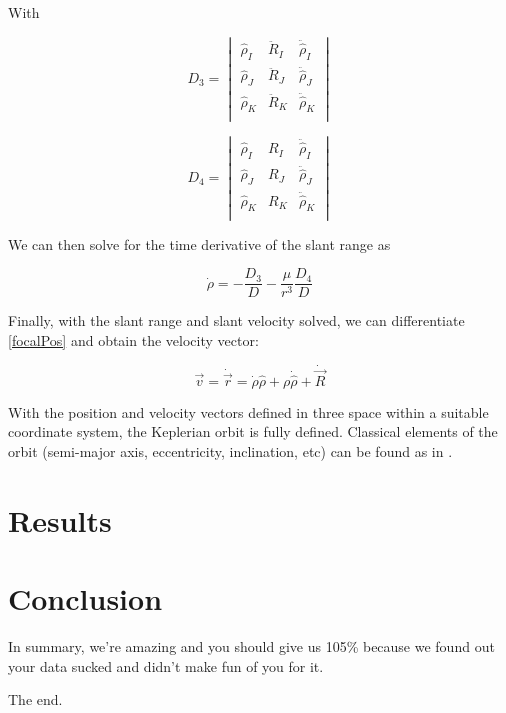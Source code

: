 \documentclass[11pt,twoside,letterpaper]{article}
\begin{document}
  With

  \begin{equation} \label{D3}
    D_3 = \begin{vmatrix}
    \hat{\rho}_I& \ddot{R}_I& \ddot{\hat{\rho}}_I \\
    \hat{\rho}_J& \ddot{R}_J& \ddot{\hat{\rho}}_J \\
    \hat{\rho}_K& \ddot{R}_K& \ddot{\hat{\rho}}_K \\
    \end{vmatrix}
  \end{equation}

  \begin{equation} \label{D4}
    D_4 = \begin{vmatrix}
    \hat{\rho}_I& R_I& \ddot{\hat{\rho}}_I \\
    \hat{\rho}_J& R_J& \ddot{\hat{\rho}}_J \\
    \hat{\rho}_K& R_K& \ddot{\hat{\rho}}_K \\
    \end{vmatrix}
  \end{equation}

  We can then solve for the time derivative of the slant range as

  \begin{equation} \label{slantDot}
    \dot{\rho} = -\frac{D_3}{D} - \frac{\mu}{r^3}\frac{D_4}{D}
  \end{equation}

  Finally, with the slant range and slant velocity solved, we can
  differentiate \ref{focalPos} and obtain the velocity vector:

  \begin{equation}\label{focalVel}
    \vec{v} = \dot{\vec{r}} =
    \dot{\rho}\hat{\rho} + \rho\dot{\hat{\rho}} + \dot{\vec{R}}
  \end{equation}

  With the position and velocity vectors defined in three space within
  a suitable coordinate system, the Keplerian orbit is fully
  defined. Classical elements of the orbit (semi-major axis,
  eccentricity, inclination, etc) can be found as in \cite{kluever_2018}.

  \section{Results}

  \section{Conclusion}
  In summary, we're amazing and you should give us 105\% because
  we found out your data sucked and didn't make fun of you for it.

  The end. 
    
  


  
  {}
  
\end{document}
